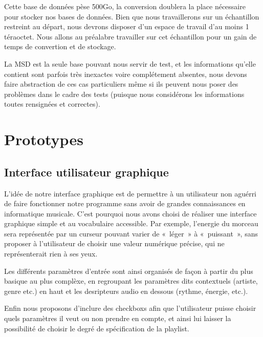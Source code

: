 Cette base de données pèse 500Go, la conversion doublera la place nécessaire pour
stocker nos bases de données. Bien que nous travaillerons sur un échantillon
restreint au départ, nous devrons disposer d’un espace de travail d’au moins 1
téraoctet. Nous allons au préalabre travailler sur cet échantillon pour un gain de temps
de convertion et de stockage.

La MSD est la seule base pouvant nous servir de test, et les informations qu'elle contient
sont parfois très inexactes voire complétement absentes, nous devons faire abstraction de
ces cas particuliers même si ils peuvent nous poser des problèmes dans le cadre des tests
(puisque nous considérons les informations toutes rensignées et correctes).

\section{Prototypes}
\label{besoins:proto}

\subsection{Interface utilisateur graphique}
\label{besoins:proto:gui}
    
L'idée de notre interface graphique est de permettre à un utilisateur non aguérri
de faire fonctionner notre programme sans avoir de grandes connaissances en
informatique musicale. C'est pourquoi nous avons choisi de réaliser une interface
graphique simple et au vocabulaire accessible. Par exemple, l'energie du morceau
sera représentée par un curseur pouvant varier de «~léger~» à «~puissant~», sans
proposer à l'utilisateur de choisir une valeur numérique précise, qui ne
représenterait rien à ses yeux.
    
Les différents paramètres d'entrée sont ainsi organisés de façon à partir du plus
basique au plus complèxe, en regroupant les paramètres dits contextuels (artiste,
genre etc.) en haut et les desripteurs audio en dessous (rythme, énergie, etc.).

Enfin nous proposons d'inclure des checkboxs afin que l'utilisateur puisse
choisir quels paramètres il veut ou non prendre en compte, et ainsi lui laisser
la possibilité de choisir le degré de spécification de la playlist.
    
